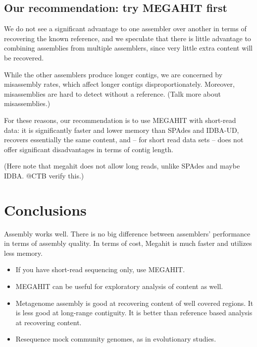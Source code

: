 \documentclass[10pt,a4paper,twocolumn]{article}
\begin{document}
\subsection*{Our recommendation: try MEGAHIT first}

We do not see a significant advantage to one assembler over another in
terms of recovering the known reference, and we speculate that there
is little advantage to combining assemblies from multiple assemblers,
since very little extra content will be recovered.

While the other assemblers produce longer contigs, we are concerned by
misassembly rates, which affect longer contigs disproportionately.
Moreover, misassemblies are hard to detect without a reference. 
(Talk
more about misassemblies.)

For these reasons, our recommendation is to use MEGAHIT with
short-read data: it is significantly faster and lower memory than
SPAdes and IDBA-UD, recovers essentially the same content, and -- for
short read data sets -- does not offer significant disadvantages in
terms of contig length.

(Here note that megahit does not allow long reads, unlike SPAdes and maybe
IDBA. @CTB verify this.)

\section*{Conclusions}

Assembly works well. There is no big difference between assemblers'
performance in terms of assembly quality. In terms of cost, Megahit is
much faster and utilizes less memory.

\begin{itemize}
\item If you have short-read sequencing only, use MEGAHIT.
\item MEGAHIT can be useful for exploratory analysis of content as well.
\item Metagenome assembly is good at recovering content of well covered
  regions.  It is less good at long-range contiguity. It is better than
  reference based analysis at recovering content.
\item Resequence mock community genomes, as in evolutionary studies.
\end{itemize}


\end{document}
